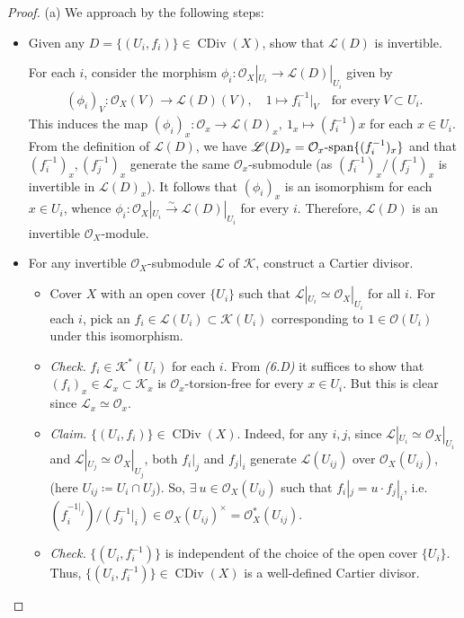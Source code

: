 \documentclass[11pt,a4paper,footinclude=true,headinclude=true]{scrbook} %
\DeclareMathOperator{\CDiv}{CDiv}
\newcommand{\KK}{\mathscr{K}}
\newcommand{\LL}{\mathscr{L}}
\newcommand{\OO}{\mathcal{O}}
\newcommand{\<}{\langle}
\newcommand{\>}{\rangle}
\newcommand{\isoto}{\overset{\sim}{\to}}
\newcommand{\spn}{\mathchar`-\mathrm{span}}
\begin{document}
\begin{proof}
    (a) We approach by the following steps:
    \begin{itemize}
        \item[(I)] Given any $D=\{(U_i,f_i)\}\in\CDiv(X)$, show that $\LL(D)$ is invertible.
        
        For each $i$, consider the morphism $\phi_i:\OO_X|_{U_i}\to\LL(D)|_{U_i}$ given by
        \begin{align*}
            (\phi_i)_V:\OO_X(V)\longrightarrow\LL(D)(V),\quad1\longmapsto f_i^{-1}|_V\quad\text{for every}\ V\subset U_i.
        \end{align*}
        This induces the map $(\phi_i)_x:\OO_x\to\LL(D)_x,\ 1_x\mapsto(f_i^{-1})x$ for each $x\in U_i$. From the definition of $\LL(D)$, we have $\LL(D)_x=\OO_x\spn\{(f_i^{-1})_x\}$ and that $(f_i^{-1})_x,(f_j^{-1})_x$ generate the same $\OO_x$-submodule (as $(f_i^{-1})_x/(f_j^{-1})_x$ is invertible in $\LL(D)_x$). It follows that $(\phi_i)_x$ is an isomorphism for each $x\in U_i$, whence $\phi_i:\OO_X|_{U_i}\isoto\LL(D)|_{U_i}$ for every $i$. Therefore, $\LL(D)$ is an invertible $\OO_X$-module.
        \item[(II)] For any invertible $\OO_X$-submodule $\LL$ of $\KK$, construct a Cartier divisor.
        \begin{itemize}
            \item Cover $X$ with an open cover $\{U_i\}$ such that $\LL|_{U_i}\simeq\OO_X|_{U_i}$ for all $i$. For each $i$, pick an $f_i\in\LL(U_i)\subset\KK(U_i)$ corresponding to $1\in\OO(U_i)$ under this isomorphism.
            \item \textit{Check.} $f_i\in\KK^\ast(U_i)$ for each $i$. From \textit{(6.D)} it suffices to show that $(f_i)_x\in\LL_x\subset\KK_x$ is $\OO_x$-torsion-free for every $x\in U_i$. But this is clear since $\LL_x\simeq\OO_x$.
            \item \textit{Claim.} $\{(U_i,f_i)\}\in\CDiv(X)$. Indeed, for any $i,j$, since $\LL|_{U_i}\simeq\OO_X|_{U_i}$ and $\LL|_{U_j}\simeq\OO_X|_{U_j}$, both $f_i|_j$ and $f_j|_i$ generate $\LL(U_{ij})$ over $\OO_X(U_{ij})$, (here $U_{ij}\coloneqq U_i\cap U_j$). So, $\exists\ u\in\OO_X(U_{ij})$ such that $f_i|_j=u\cdot f_j|_i$, i.e. $(f_i^{-1|_j})/(f_j^{-1}|_i)\in\OO_X(U_{ij})^\times=\OO_X^\ast(U_{ij})$.
            \item \textit{Check.} $\{(U_i,f_i^{-1})\}$ is independent of the choice of the open cover $\{U_i\}$. Thus, $\{(U_i,f_i^{-1})\}\in\CDiv(X)$ is a well-defined Cartier divisor.
        \end{itemize}

\end{itemize}
\end{proof}
\end{document}
